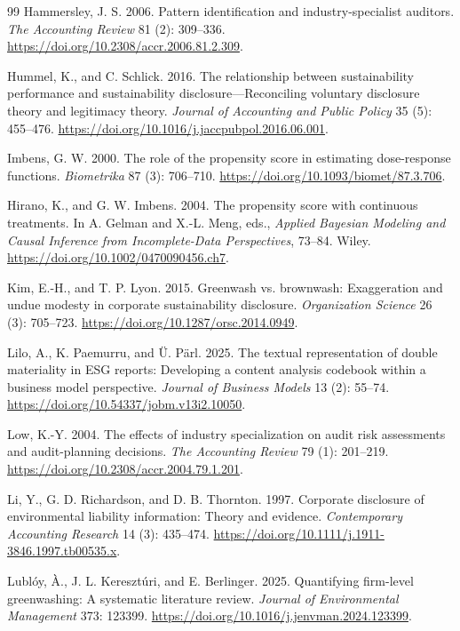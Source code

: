 \documentclass[11pt]{article}
\begin{document}
\begin{thebibliography}{99}
Hammersley, J. S. 2006.
Pattern identification and industry-specialist auditors.
\textit{The Accounting Review} 81 (2): 309--336. \url{https://doi.org/10.2308/accr.2006.81.2.309}.

Hummel, K., and C. Schlick. 2016.
The relationship between sustainability performance and sustainability disclosure---Reconciling voluntary disclosure theory and legitimacy theory.
\textit{Journal of Accounting and Public Policy} 35 (5): 455--476. \url{https://doi.org/10.1016/j.jaccpubpol.2016.06.001}.

Imbens, G. W. 2000.
The role of the propensity score in estimating dose-response functions.
\textit{Biometrika} 87 (3): 706--710. \url{https://doi.org/10.1093/biomet/87.3.706}.

Hirano, K., and G. W. Imbens. 2004.
The propensity score with continuous treatments.
In A. Gelman and X.-L. Meng, eds., \textit{Applied Bayesian Modeling and Causal Inference from Incomplete-Data Perspectives}, 73--84. Wiley. \url{https://doi.org/10.1002/0470090456.ch7}.

Kim, E.-H., and T. P. Lyon. 2015.
Greenwash vs. brownwash: Exaggeration and undue modesty in corporate sustainability disclosure.
\textit{Organization Science} 26 (3): 705--723. \url{https://doi.org/10.1287/orsc.2014.0949}.

Lilo, A., K. Paemurru, and Ü. Pärl. 2025.
The textual representation of double materiality in ESG reports: Developing a content analysis codebook within a business model perspective.
\textit{Journal of Business Models} 13 (2): 55--74. \url{https://doi.org/10.54337/jobm.v13i2.10050}.

Low, K.-Y. 2004.
The effects of industry specialization on audit risk assessments and audit-planning decisions.
\textit{The Accounting Review} 79 (1): 201--219. \url{https://doi.org/10.2308/accr.2004.79.1.201}.

Li, Y., G. D. Richardson, and D. B. Thornton. 1997.
Corporate disclosure of environmental liability information: Theory and evidence.
\textit{Contemporary Accounting Research} 14 (3): 435--474. \url{https://doi.org/10.1111/j.1911-3846.1997.tb00535.x}.

Lubl\'oy, \`A., J. L. Kereszt\'uri, and E. Berlinger. 2025.
Quantifying firm-level greenwashing: A systematic literature review.
\textit{Journal of Environmental Management} 373: 123399. \url{https://doi.org/10.1016/j.jenvman.2024.123399}.


\end{thebibliography}
\end{document}
